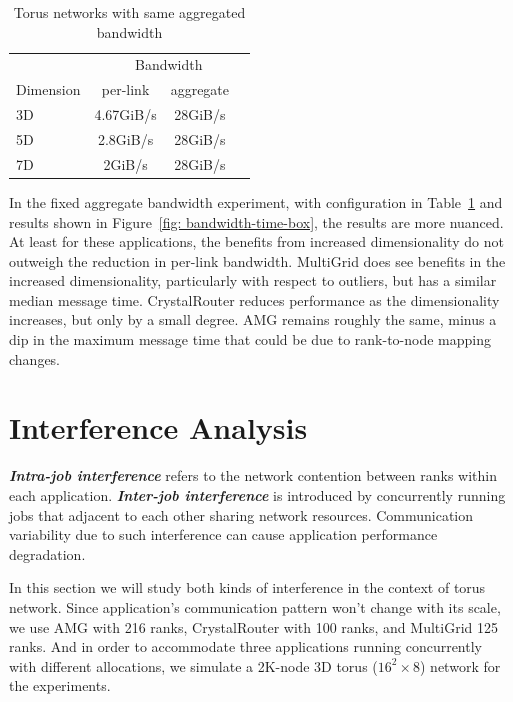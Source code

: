 \documentclass[conference]{IEEEtran}
\begin{document}
\begin{table}[ht]
\begin{center}
\caption{Torus networks with same aggregated bandwidth} 
\label{tab: fix-bandwidth}
\begin{tabular}{l c c c} 
\toprule %
\toprule
&\multicolumn{3}{c}{Bandwidth } \\
\cmidrule(l){2-4}
Dimension  & per-link & aggregate &\\ %
\midrule %
3D      & 4.67GiB/s  & 28GiB/s  & \\  %
\midrule %
5D    & 2.8GiB/s  & 28GiB/s  &\\ %
\midrule %
7D    & 2GiB/s & 28GiB/s & \\
\midrule
\bottomrule %
\end{tabular}
\end{center}
\end{table}

In the fixed aggregate bandwidth experiment, with configuration in Table~\ref{tab: fix-bandwidth} and results shown in Figure~\ref{fig: bandwidth-time-box}, the results are more nuanced. At least for these applications, the benefits from increased dimensionality do not outweigh the reduction in per-link bandwidth. MultiGrid does see benefits in the increased dimensionality, particularly with respect to outliers, but has a similar median message time. CrystalRouter reduces performance as the dimensionality increases, but only by a small degree. AMG remains roughly the same, minus a dip in the maximum message time that could be due to rank-to-node mapping changes.


\section{Interference Analysis}
\label{sec:interference}

\textbf{\emph{Intra-job interference}} refers to the network contention between ranks within each application. \textbf{\emph{Inter-job interference}} is introduced by concurrently running jobs that adjacent to each other sharing network resources. Communication variability due to such interference can cause application performance degradation.

In this section we will study both kinds of interference in the context of torus network. 
Since application's communication pattern won't change with its scale, we use AMG with 216 ranks, CrystalRouter with 100 ranks, and MultiGrid 125 ranks. And in order to accommodate three applications running concurrently with different allocations, we simulate a 2K-node 3D torus ($16^{2} \times 8$) network for the experiments.
\end{document}

